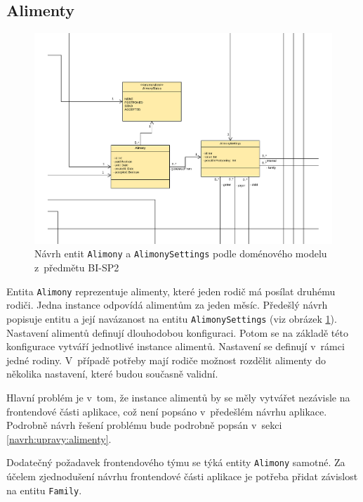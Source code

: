     \subsection{Alimenty}
        \begin{figure}\centering
	        \includegraphics[width=1.0\textwidth]{pdfs/AlimonyDraft1}
	        \caption[Návrh entit \texttt{Alimony} a \texttt{AlimonySettings}]{Návrh entit \texttt{Alimony} a \texttt{AlimonySettings} podle doménového modelu z~předmětu BI-SP2}\label{image:aliomny-draft1}
        \end{figure}
        Entita \verb|Alimony| reprezentuje alimenty, které jeden rodič má posílat druhému rodiči. Jedna instance odpovídá alimentům za jeden měsíc. Předešlý návrh popisuje entitu a její navázanost na entitu \verb|AlimonySettings| (viz obrázek \ref{image:aliomny-draft1}). Nastavení alimentů definují dlouhodobou konfiguraci. Potom se na základě této konfigurace vytváří jednotlivé instance alimentů. Nastavení se definují v~rámci jedné rodiny. V~případě potřeby mají rodiče možnost rozdělit alimenty do několika nastavení, které budou současně validní.
        
        Hlavní problém je v~tom, že instance alimentů by se měly vytvářet nezávisle na frontendové části aplikace, což není popsáno v~předešlém návrhu aplikace. Podrobně návrh řešení problému bude podrobně popsán v~sekci \ref{navrh:upravy:alimenty}.
        
        Dodatečný požadavek frontendového týmu se týká entity \texttt{Alimony} samotné. Za účelem zjednodušení návrhu frontendové části aplikace je potřeba přidat závislost na entitu \texttt{Family}. 
        
